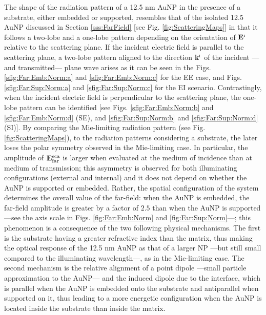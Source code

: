 The shape of the radiation pattern of a 12.5 nm AuNP in the presence of a substrate, either embedded or supported, resembles that of the isolated 12.5 AuNP discussed in Section \ref{sss:FarField} [see Fig. \ref{fig:ScatteringMaps}] in that it follows a two-lobe and a one-lobe pattern depending on the orientation of $\vb{E}^\text{i}$ relative to the scattering plane. If the incident electric field is parallel to the scattering plane, a two-lobe pattern aligned to the direction $\vb{k}^\text{i}$ of the incident ---and transmitted--- plane wave arises as it can be seen in the Figs. \ref{sfig:Far:Emb:Norm:a} and  \ref{sfig:Far:Emb:Norm:c} for the EE case, and Figs.  \ref{sfig:Far:Sup:Norm:a} and \ref{sfig:Far:Sup:Norm:c} for the EI scenario. Contrastingly, when the incident electric field is perpendicular to the scattering plane, the one-lobe pattern can be identified [see Figs. \ref{sfig:Far:Emb:Norm:b} and \ref{sfig:Far:Emb:Norm:d} (SE), and \ref{sfig:Far:Sup:Norm:b} and \ref{sfig:Far:Sup:Norm:d} (SI)]. By comparing the Mie-limiting radiation pattern (see Fig. \ref{fig:ScatteringMaps}), to the radiation patterns considering a substrate, the later loses the polar symmetry observed in the Mie-limiting case.  In particular, the amplitude of $\vb{E}^\text{sca}_\text{far}$ is larger when evaluated at the medium of incidence  than at medium of transmission; this asymmetry is observed for both illuminating configurations (external and internal) and it does not depend on whether the AuNP is supported or embedded. Rather, the spatial configuration of the system determines the overall value of the far-field: when the AuNP is embedded, the far-field amplitude is greater by a factor of $2.5$  than when the AuNP is supported ---see the axis scale in Figs. \ref{fig:Far:Emb:Norm} and \ref{fig:Far:Sup:Norm}---; this phenomenon  is a consequence of the two following physical mechanisms. The first is the substrate having a greater refractive index than the matrix, thus making the optical response of the 12.5 nm AuNP as that of a larger NP ---but still small compared to the illuminating wavelength---, as in the Mie-limiting case. The second mechanism is the relative alignment of a point dipole ---small particle approximation to the AuNP--- and the induced dipole due to the interface, which is parallel when the AuNP is embedded onto the substrate and antiparallel when supported on it, thus leading to a more energetic configuration when the AuNP is located inside the substrate than inside the matrix.

